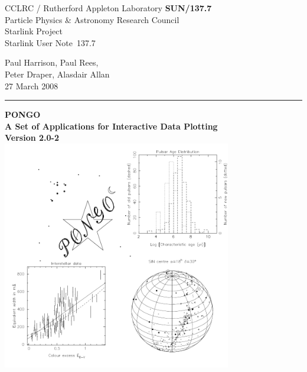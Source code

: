 \documentclass[twoside,11pt]{article}
\newcommand{\stardoccategory}  {Starlink User Note}
\newcommand{\stardocinitials}  {SUN}
\newcommand{\stardocnumber}    {137.7}
\newcommand{\stardocauthors}   {Paul Harrison, Paul Rees, \\
                                Peter Draper, Alasdair Allan }
\newcommand{\stardocdate}      {27 March 2008}
\newcommand{\stardoctitle}     {PONGO\\[\latex{2ex}]
   A Set of Applications for Interactive Data Plotting \\[\latex{2ex}]
   Version 2.0-2}
\newcommand{\stardocname}{\stardocinitials /\stardocnumber}
\newenvironment{latexonly}{}{}
\newcommand{\latex}[1]{#1}
\renewcommand{\_}{\texttt{\symbol{95}}}
\begin{document}
\thispagestyle{empty}

\begin{latexonly}
   CCLRC / {\sc Rutherford Appleton Laboratory} \hfill {\bf \stardocname}\\
   {\large Particle Physics \& Astronomy Research Council}\\
   {\large Starlink Project\\}
   {\large \stardoccategory\ \stardocnumber}
   \begin{flushright}
   \stardocauthors\\
   \stardocdate
   \end{flushright}
   \vspace{-4mm}
   \rule{\textwidth}{0.5mm}
   \vspace{5mm}
   \begin{center}
   {\Large\bf  \stardoctitle \\ [3.0ex]}
   \setlength{\unitlength}{1in}
   \centering \includegraphics[width=100mm]{sun137_cover}
   \end{center}
   \vspace{5mm}

\end{latexonly}
\end{document}
